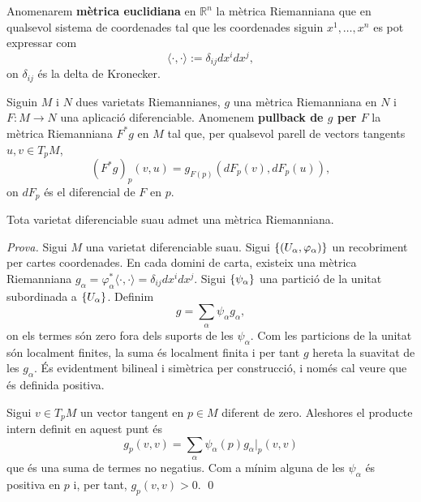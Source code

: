 \begin{defi}
    Anomenarem \textbf{mètrica euclidiana} en $\mathbb R^n$ la mètrica Riemanniana que en qualsevol sistema de coordenades tal que les coordenades siguin $x^1,\dots,x^n$ es pot expressar com
    \begin{equation*}
        \langle\cdot,\cdot\rangle := \delta_{ij}dx^idx^j,
    \end{equation*}
    on $\delta_{ij}$ és la delta de Kronecker.
\end{defi}

\begin{defi}\label{def:pullback_metric}
    Siguin $M$ i $N$ dues varietats Riemannianes, $g$ una mètrica Riemanniana en $N$ i $F:M\to N$ una aplicació diferenciable. Anomenem \textbf{pullback de $g$ per $F$} la mètrica Riemanniana $F^*g$ en $M$ tal que, per qualsevol parell de vectors tangents $u,v\in T_pM$,
    \begin{equation*}
        (F^*g)_p(v,u) = g_{F(p)}(dF_p(v),dF_p(u)),
    \end{equation*}
    on $dF_p$ és el diferencial de $F$ en $p$.
\end{defi}

\begin{prop}
    Tota varietat diferenciable suau admet una mètrica Riemanniana.
\end{prop}
{
    \color{green!50!black} \textit{Prova.}
    Sigui $M$ una varietat diferenciable suau. Sigui $\{(U_\alpha,\varphi_\alpha)\}$ un recobriment per cartes coordenades. En cada domini de carta, existeix una mètrica Riemanniana $g_\alpha = \varphi_\alpha^*\langle\cdot,\cdot\rangle = \delta_{ij}dx^idx^j$. Sigui $\{\psi_\alpha\}$ una partició de la unitat subordinada a $\{U_\alpha\}$. Definim 
    \begin{equation*}
        g = \sum_{\alpha} \psi_\alpha g_\alpha,
    \end{equation*}
    on els termes són zero fora dels suports de les $\psi_\alpha$. Com les particions de la unitat són localment finites, la suma és localment finita i per tant $g$ hereta la suavitat de les $g_\alpha$. És evidentment bilineal i simètrica per construcció, i només cal veure que és definida positiva.

    Sigui $v\in T_pM$ un vector tangent en $p\in M$ diferent de zero. Aleshores el producte intern definit en aquest punt és
    \begin{equation*}
        g_p(v,v) = \sum_\alpha \psi_\alpha(p) g_\alpha|_p(v,v)
    \end{equation*}
    que és una suma de termes no negatius. Com a mínim alguna de les $\psi_\alpha$ és positiva en $p$ i, per tant, $g_p(v,v) > 0$.
    \qed
}

